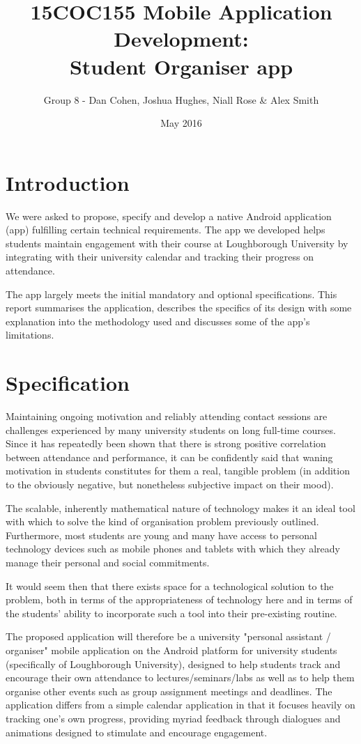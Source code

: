 \documentclass{article}
\title{15COC155 Mobile Application Development: \\
    Student Organiser app}
\author{Group 8 - Dan Cohen, Joshua Hughes, Niall Rose \& Alex Smith}
\date{May 2016}
\begin{document}
\maketitle

\tableofcontents
\newpage

\section{Introduction}
We were asked to propose, specify and develop a native Android application (app) fulfilling certain technical requirements. The app we developed helps students maintain engagement with their course at Loughborough University by integrating with their university calendar and tracking their progress on attendance.

The app largely meets the initial mandatory and optional specifications. This report summarises the application, describes the specifics of its design with some explanation into the methodology used and discusses some of the app's limitations.

\section{Specification}
Maintaining ongoing motivation and reliably attending contact sessions are challenges experienced by many university students on long full-time courses. Since it has repeatedly been shown that there is strong positive correlation between attendance and performance, it can be confidently said that waning motivation in students constitutes for them a real, tangible problem (in addition to the obviously negative, but nonetheless subjective impact on their mood). 

The scalable, inherently mathematical nature of technology makes it an ideal tool with which to solve the kind of organisation problem previously outlined. Furthermore, most students are young and many have access to personal technology devices such as mobile phones and tablets with which they already manage their personal and social commitments. 

It would seem then that there exists space for a technological solution to the problem, both in terms of the appropriateness of technology here and in terms of the students' ability to incorporate such a tool into their pre-existing routine.

The proposed application will therefore be a university "personal assistant / organiser" mobile application on the Android platform for university students (specifically of Loughborough University), designed to help students track and encourage their own attendance to lectures/seminars/labs as well as to help them organise other events such as group assignment meetings and deadlines. The application differs from a simple calendar application in that it focuses heavily on tracking one's own progress, providing myriad feedback through dialogues and animations designed to stimulate and encourage engagement.
\end{document}
